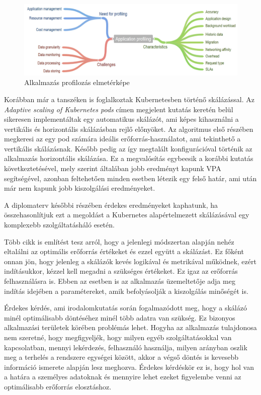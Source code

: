 \begin{figure}[!ht]
\centering
\includegraphics[width=150mm, keepaspectratio]{figures/applicationprofiling.png}
\caption{Alkalmazás profilozás elmetérképe\citep{CloudResourceManagement}}
\label{fig:applicationprofiling}
\end{figure}

Korábban már a tanszéken is foglalkoztak Kubernetesben történő skálázással. Az \emph{Adaptive scaling of Kubernetes pods}\cite{AdaptiveScalingOfPods} címen megjelent kutatás keretén belül sikeresen implementáltak egy automatikus skálázót, ami képes kihasználni a vertikális és horizontális skálázásban rejlő előnyöket. Az algoritmus első részében megkeresi az egy pod számára ideális erőforrás-használatot, ami tekinthető a vertikális skálázásnak. Később pedig az így megtalált konfigurációval történik az alkalmazás horizontális skálázása. Ez a megvalósítás egybeesik a korábbi kutatás következtetésével\citep{bscThesis}, mely szerint általában jobb eredményt kapunk VPA segítségével, azonban feltehetően minden esetben létezik egy felső határ, ami után már nem kapunk jobb kiszolgálási eredményeket. 

A diplomaterv későbbi részében érdekes eredményeket kaphatunk, ha összehasonlítjuk ezt a megoldást a Kubernetes alapértelmezett skálázásával egy komplexebb szolgáltatásháló esetén.

Több cikk\cite{AdaptiveScalingOfPods}\citep{PredictingUsageAndProactiveScaling} is említést tesz
arról, hogy a jelenlegi módszertan alapján nehéz eltalálni az optimális erőforrás értékeket és ezzel
együtt a skálázást. Ez főként onnan jön, hogy jelenleg a skálázók kevés logikával és metrikával
működnek, ezért indításukkor, kézzel kell megadni a szükséges értékeket. Ez igaz az erőforrás
felhasználásra is. Ebben az esetben is az alkalmazás üzemeltetője adja meg indítás idejében a
paramétereket, amik befolyásolják a kiszolgálás minőségét is. 

Érdekes kérdés, ami irodalomkutatás során fogalmazódott meg, hogy a skálázó minél optimálisabb döntéséhez minél több adatra van szükség. Ez bizonyos alkalmazási területek körében problémás lehet. Hogyha az alkalmazás tulajdonosa nem szeretné, hogy megfigyeljék, hogy milyen egyéb szolgáltatásokkal van kapcsolatban, mennyi lekérdezés, felhasználó használja, milyen arányban oszlik meg a terhelés a rendszere egységei között, akkor a végső döntés is kevesebb információ ismerete alapján lesz meghozva. Érdekes kérdéskör ez is, hogy hol van a határa a személyes adatoknak és mennyire lehet ezeket figyelembe venni az optimálisabb erőforrás elosztáshoz.

